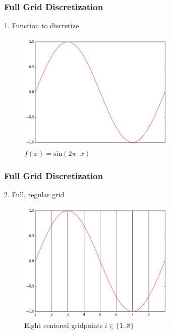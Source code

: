 \begin{frame}
  \frametitle{Full Grid Discretization}
  \topline
  \vspace{-10px}
  \begin{block}{1. Function to discretize}
    \begin{figure}[!htp]

      \centering
      \includegraphics[width=7.5cm]{images/singlebasis_1}
      \vspace{-12px}
      \caption{$f(x) =\text{sin}(2\pi \cdot x)$}
    \end{figure}
  \end{block}
\end{frame}

\begin{frame}
  \frametitle{Full Grid Discretization}
  \topline
  \vspace{-10px}
  \begin{block}{2. Full, regular grid}
    \begin{figure}[!htp]

      \centering
      \includegraphics[width=7.5cm]{images/singlebasis_2}
      \vspace{-12px}
      \caption{Eight centered gridpoints $i \in \{1..8\}$}
    \end{figure}
  \end{block}
\end{frame}

